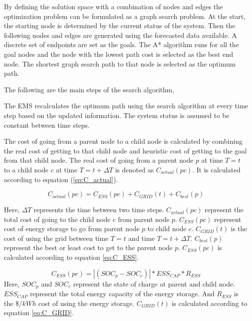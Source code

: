 By defining the solution space with a combination of nodes and edges the optimization problem can be formulated as a graph search problem. At the start, the starting node is determined by the current status of the system. Then the following nodes and edges are generated using the forecasted data available. A discrete set of endpoints are set as the goals. The A*  algorithm runs for all the goal nodes and the node with the lowest path cost is selected as the best end node. The shortest graph search path to that node is selected as the optimum path.

The following are the main steps of the search algorithm,


The EMS recalculates the optimum path using the search algorithm at every time step based on the updated information. The system status is assumed to be constant between time steps.

The cost of going from a parent node to a child node is calculated by combining the real cost of getting to that child node and heuristic cost of getting to the goal from that child node. The real cost of going from a parent node $p$ at time $T=t$ to a child node $c$ at time $T=t+\Delta T$ is denoted as $C_{actual}(pc)$. It is calculated according to equation (\ref{eq:C_actual}).

\begin{equation}
\label{eq:C_actual}
    C_{actual}(pc) =  C_{ESS}(pc)+C_{GRID}(t)+C_{best}(p)
\end{equation}

Here, $\Delta T$ represents the time between two time steps. $C_{actual}(pc)$ represent the total cost of going to the child node $c$ from parent node $p$. $C_{ESS}(pc)$ represent cost of energy storage to go from parent node $p$ to child node $c$. $C_{GRID}(t)$ is the cost of using the grid between time $T=t$ and time $T=t+\Delta T$. $C_{best}(p)$ represent the best or least cost to get to the parent node $p$. $C_{ESS}(pc)$ is calculated according to equation \ref{eq:C_ESS}.

\begin{equation}
\label{eq:C_ESS}
C_{ESS}(pc) = |(SOC_p - SOC_c)|*ESS_{CAP}*R_{ESS} 
\end{equation}
Here, $SOC_p$ and $SOC_c$ represent the state of charge at parent and child node. $ESS_{CAP}$ represent the total energy capacity of the energy storage. And $R_{ESS}$ is the $\$/kWh$ cost of using the energy storage. $C_{GRID}(t)$ is calculated according to equation \ref{eq:C_GRID}.

